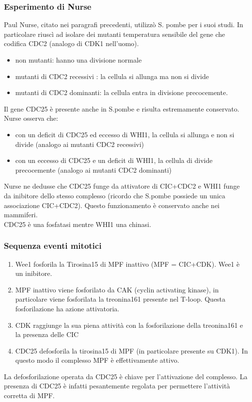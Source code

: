         \subsubsection{Esperimento di Nurse}
            Paul Nurse, citato nei paragrafi precedenti, utilizzò S. pombe per i suoi studi. In particolare riuscì ad isolare dei mutanti temperatura sensibile del gene che codifica CDC2 (analogo di CDK1 nell'uomo).
            \begin{itemize}
                \item non mutanti: hanno una divisione normale
                \item mutanti di CDC2 recessivi : la cellula si allunga ma non si divide
                \item mutanti di CDC2 dominanti: la cellula entra in divisione precocemente.
            \end{itemize}
            Il gene CDC25 è presente anche in S.pombe e risulta estremamente conservato. Nurse osserva che:
            \begin{itemize}
                \item con un deficit di CDC25 ed eccesso di WHI1, la cellula si allunga e non si divide (analogo ai mutanti CDC2 recessivi)
                \item con un eccesso di CDC25 e un deficit di WHI1, la cellula di divide precocemente (analogo ai mutanti CDC2 dominanti)
            \end{itemize}
            Nurse ne dedusse che CDC25 funge da attivatore di CIC+CDC2 e WHI1 funge da inibitore dello stesso complesso (ricordo che S.pombe possiede un unica associazione CIC+CDC2). Questo funzionamento è conservato anche nei mammiferi.\\
            CDC25 è una fosfatasi mentre WHI1 una chinasi.
            
        \subsubsection{Sequenza eventi mitotici}
            \begin{enumerate}
                \item Wee1 fosforila la Tirosina15 di MPF inattivo (MPF = CIC+CDK). Wee1 è un inibitore.
                \item MPF inattivo viene fosforilato da CAK (cyclin activating kinase), in particolare viene fosforilata la treonina161 presente nel T-loop. Questa fosforilazione ha azione attivatoria.
                \item CDK raggiunge la sua piena attività con la fosforilazione della treonina161 e la presenza delle CIC
                \item CDC25 defosforila la tirosina15 di MPF (in particolare presente su CDK1). In questo modo il complesso MPF è effettivamente attivo.
            \end{enumerate}
            La defosforilazione operata da CDC25 è chiave per l'attivazione del complesso. La presenza di CDC25 è infatti pesantemente regolata per permettere l'attività corretta di MPF.
            
